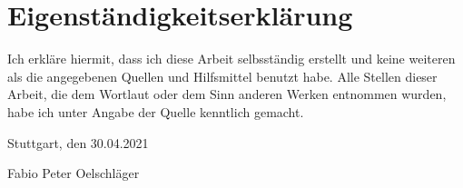 \chapter{Eigenständigkeitserklärung}
Ich erkläre hiermit, dass ich diese Arbeit selbsständig erstellt
und keine weiteren als die angegebenen Quellen und Hilfsmittel
benutzt habe. Alle Stellen dieser Arbeit, die dem Wortlaut oder
dem Sinn anderen Werken entnommen wurden, habe ich unter Angabe
der Quelle kenntlich gemacht.

Stuttgart, den 30.04.2021


Fabio Peter Oelschläger
